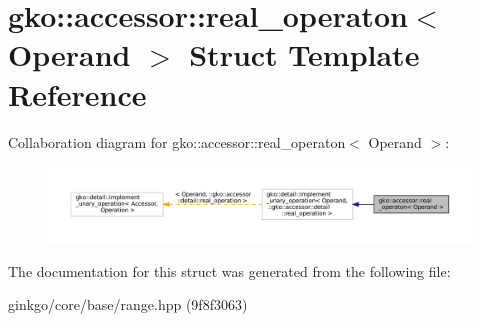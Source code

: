 \hypertarget{structgko_1_1accessor_1_1real__operaton}{}\section{gko\+:\+:accessor\+:\+:real\+\_\+operaton$<$ Operand $>$ Struct Template Reference}
\label{structgko_1_1accessor_1_1real__operaton}


Collaboration diagram for gko\+:\+:accessor\+:\+:real\+\_\+operaton$<$ Operand $>$\+:
\nopagebreak
\begin{figure}[H]
\begin{center}
\leavevmode
\includegraphics[width=350pt]{structgko_1_1accessor_1_1real__operaton__coll__graph}
\end{center}
\end{figure}


The documentation for this struct was generated from the following file\+:\begin{DoxyCompactItemize}
\item 
ginkgo/core/base/range.\+hpp (9f8f3063)\end{DoxyCompactItemize}
